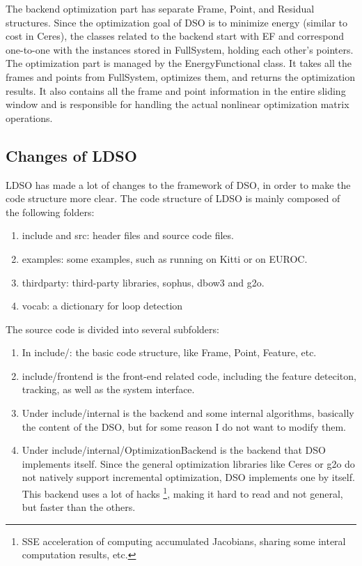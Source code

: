 \documentclass[a4paper,10pt]{article}
\begin{document}
	The backend optimization part has separate Frame, Point, and Residual structures. Since the optimization goal of DSO is to minimize energy (similar to cost in Ceres), the classes related to the backend start with EF and correspond one-to-one with the instances stored in FullSystem, holding each other's pointers. The optimization part is managed by the EnergyFunctional class. It takes all the frames and points from FullSystem, optimizes them, and returns the optimization results. It also contains all the frame and point information in the entire sliding window and is responsible for handling the actual nonlinear optimization matrix operations.

	
	\subsection{Changes of LDSO}
	LDSO has made a lot of changes to the framework of DSO, in order to make the code structure more clear. The code structure of LDSO is mainly composed of the following folders:
	\begin{enumerate}
	\item include and src: header files and source code files.
	\item examples: some examples, such as running on Kitti or on EUROC.
	\item thirdparty: third-party libraries, sophus, dbow3 and g2o.
	\item vocab: a dictionary for loop detection
	\end{enumerate}
	The source code is divided into several subfolders:
	\begin{enumerate}
	\item In include/: the basic code structure, like Frame, Point, Feature, etc.
	\item include/frontend is the front-end related code, including the feature deteciton, tracking, as well as the system interface.
	\item Under include/internal is the backend and some internal algorithms, basically the content of the DSO, but for some reason I do not want to modify them.
	\item Under include/internal/OptimizationBackend is the backend that DSO implements itself. Since the general optimization libraries like Ceres or g2o do not natively support incremental optimization, DSO implements one by itself. This backend uses a lot of hacks \footnote{SSE acceleration of computing accumulated Jacobians, sharing some interal computation results, etc.}, making it hard to read and not general, but faster than the others.
	\end{enumerate}
\end{document}
